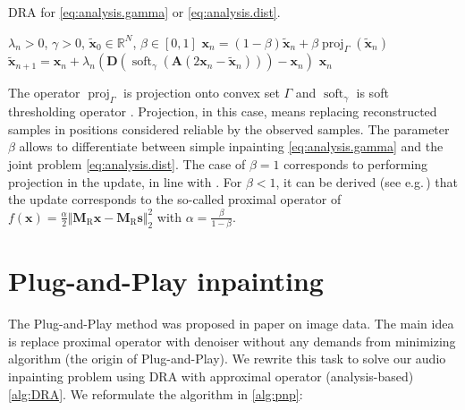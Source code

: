 \documentclass[conference]{IEEEtran}
\newcommand{\todo}[1]{\textcolor{red}{#1}}
\begin{document}
\begin{algorithm}
	\caption{DRA for \eqref{eq:analysis.gamma} or \eqref{eq:analysis.dist}.}
	\begin{algorithmic}[1]\label{alg:DRA}
		\renewcommand{\algorithmicrequire}{\textbf{Input:}}
		\renewcommand{\algorithmicensure}{\textbf{Output:}}
		\REQUIRE $ \lambda_n > 0 $, $ \gamma>0 $, $ \mathbf{\widetilde{x}}_0 \in \mathbb{R}^{N} $, $\beta \in [0, 1]$
		\STATE $\mathbf{x}_n= (1-\beta)\mathbf{\widetilde{x}}_n + \beta \operatorname{proj}_{\Gamma}(\mathbf{\widetilde{x}}_n) $ 
		\STATE $ \mathbf{\widetilde{x}}_{n+1} = \mathbf{x}_n + \lambda_n \left( \mathbf{D}\left(\operatorname{soft}_{\gamma}\left(\mathbf{A}\left(2\mathbf{x}_n-\mathbf{\widetilde{x}}_n\right) \right)\right) -\mathbf{x}_n\right)$
		\ENDFOR
		\RETURN $\mathbf{x}_n$ %
	\end{algorithmic} 
\end{algorithm}

The operator $ \operatorname{proj}_{\Gamma}$ is projection onto convex set $ \Gamma $ and $\operatorname{soft}_{\gamma}$ is soft thresholding operator \cite{Combettes2011}.
Projection, in this case, means replacing reconstructed samples in positions considered reliable by the observed samples.
The parameter $\beta$ allows to differentiate between simple inpainting \eqref{eq:analysis.gamma} and the joint problem \eqref{eq:analysis.dist}.
The case of $\beta = 1$ corresponds to performing projection in the update, in line with \cite{Mokry2020}.
For $\beta < 1$, it can be derived (see e.g.\,\cite[Sec.\,4 and Tab.\,1]{Combettes2011}) that the update corresponds to the so-called proximal operator of $f(\mathbf{x}) = \frac{\alpha}{2} \Vert \mathbf{M}_{\mathrm{R}} \mathbf {x} - \mathbf{M}_{\mathrm{R}} \mathbf{s} \Vert^2_2$ with $\alpha = \frac{\beta}{1-\beta}$.


\section{Plug-and-Play inpainting} \label{sec:plugaandplay}

The Plug-and-Play method was proposed in paper \cite{Chan2016} on image data.
The main idea is replace proximal operator with denoiser without any demands from minimizing algorithm (the origin of Plug-and-Play).
We rewrite this task to solve our audio inpainting problem using DRA with approximal operator (analysis-based) \ref{alg:DRA}.
We reformulate the algorithm in \ref{alg:pnp}:
\end{document}
